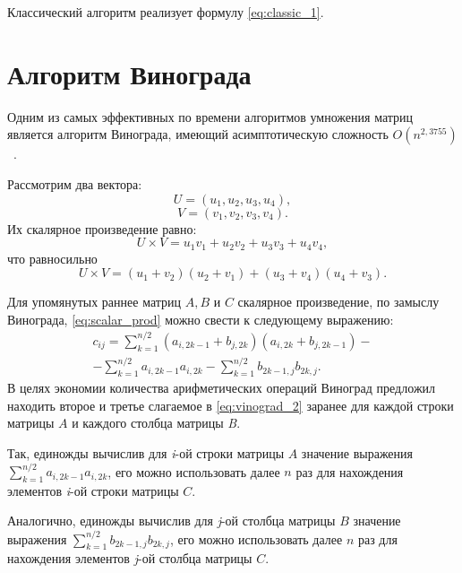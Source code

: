 Классический алгоритм реализует формулу \ref{eq:classic_1}.

\section{Алгоритм Винограда}
Одним из самых эффективных по времени алгоритмов умножения матриц является алгоритм Винограда, имеющий асимптотическую сложность $O(n^{2,3755})$~\cite{vinograd-haskell}.

Рассмотрим два вектора:
\begin{equation}
    U = (u_{1}, u_{2}, u_{3}, u_{4}),
\end{equation}
\begin{equation}
    V = (v_{1}, v_{2}, v_{3}, v_{4}).
\end{equation}
Их скалярное произведение равно:
\begin{equation}
    \label{eq:scalar_prod}
    U \times V = u_{1}v_{1} + u_{2}v_{2} + u_{3}v_{3} + u_{4}v_{4},
\end{equation}
что равносильно
\begin{equation}
    \label{eq:vinograd_1}
    U \times V = (u_{1} + v_{2})(u_{2} + v_{1}) + (u_{3} + v_{4})(u_{4} + v_{3}).
\end{equation}

Для упомянутых раннее матриц $A, B$ и $C$ скалярное произведение, по замыслу Винограда, \ref{eq:scalar_prod} можно свести к следующему выражению:
\begin{multline}
    \label{eq:vinograd_2}
    c_{ij} = \sum_{k = 1}^{n / 2}(a_{i,2k - 1} + b_{j, 2k})(a_{i,2k} + b_{j, 2k - 1}) - \\ - \sum_{k = 1}^{n / 2}a_{i,2k - 1}a_{i,2k} - \sum_{k = 1}^{n / 2}b_{2k - 1,j}b_{2k,j}.
\end{multline}
В целях экономии количества арифметических операций Виноград предложил находить второе и третье слагаемое в \ref{eq:vinograd_2} заранее для каждой строки матрицы $A$ и каждого столбца матрицы \textit{B}.

Так, единожды вычислив для \textit{i}-ой строки матрицы $A$ значение выражения $\sum_{k = 1}^{n / 2}a_{i,2k - 1}a_{i,2k}$, его можно использовать далее $n$ раз для нахождения элементов \textit{i}-ой строки матрицы $C$.  

Аналогично, единожды вычислив для \textit{j}-ой столбца матрицы $B$ значение выражения $\sum_{k = 1}^{n / 2}b_{2k - 1,j}b_{2k,j}$, его можно использовать далее $n$ раз для нахождения элементов \textit{j}-ой столбца матрицы $C$.

